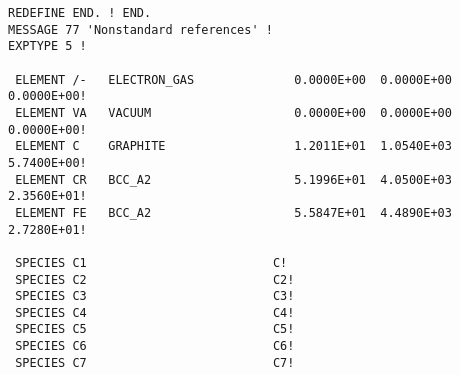 \documentclass[12pt]{article}
\begin{document}
\begin{verbatim}
REDEFINE END. ! END.
MESSAGE 77 'Nonstandard references' !
EXPTYPE 5 !

 ELEMENT /-   ELECTRON_GAS              0.0000E+00  0.0000E+00  0.0000E+00!
 ELEMENT VA   VACUUM                    0.0000E+00  0.0000E+00  0.0000E+00!
 ELEMENT C    GRAPHITE                  1.2011E+01  1.0540E+03  5.7400E+00!
 ELEMENT CR   BCC_A2                    5.1996E+01  4.0500E+03  2.3560E+01!
 ELEMENT FE   BCC_A2                    5.5847E+01  4.4890E+03  2.7280E+01!

 SPECIES C1                          C!
 SPECIES C2                          C2!
 SPECIES C3                          C3!
 SPECIES C4                          C4!
 SPECIES C5                          C5!
 SPECIES C6                          C6!
 SPECIES C7                          C7!


\end{verbatim}
\end{document}
